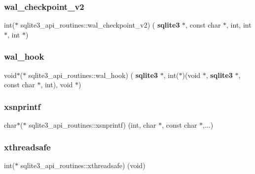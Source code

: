 \mbox{\label{structsqlite3__api__routines_a86ce375053098d8fbb2d686e9d98d12e}} 
\subsubsection{wal\_checkpoint\_v2}
{\footnotesize\ttfamily int($\ast$ sqlite3\+\_\+api\+\_\+routines\+::wal\+\_\+checkpoint\+\_\+v2) (\textbf{ sqlite3} $\ast$, const char $\ast$, int, int $\ast$, int $\ast$)}

\mbox{\label{structsqlite3__api__routines_ab2ee32e155fc08dc01f10e11fcd31d00}} 
\subsubsection{wal\_hook}
{\footnotesize\ttfamily void$\ast$($\ast$ sqlite3\+\_\+api\+\_\+routines\+::wal\+\_\+hook) (\textbf{ sqlite3} $\ast$, int($\ast$)(void $\ast$, \textbf{ sqlite3} $\ast$, const char $\ast$, int), void $\ast$)}

\mbox{\label{structsqlite3__api__routines_adb2163474509da18cbe39f8b32a82010}} 
\subsubsection{xsnprintf}
{\footnotesize\ttfamily char$\ast$($\ast$ sqlite3\+\_\+api\+\_\+routines\+::xsnprintf) (int, char $\ast$, const char $\ast$,...)}

\mbox{\label{structsqlite3__api__routines_a965bd76d061a5f47729a6c96faac3aa2}} 
\subsubsection{xthreadsafe}
{\footnotesize\ttfamily int($\ast$ sqlite3\+\_\+api\+\_\+routines\+::xthreadsafe) (void)}

\mbox{\label{structsqlite3__api__routines_ad7af935fd4233623388f4d4ed710a0b0}} 
